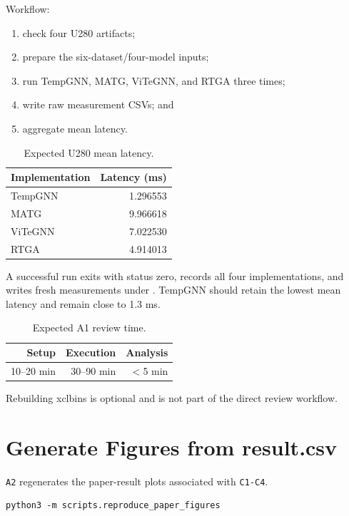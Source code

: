 \documentclass[conference]{IEEEtran}
\begin{document}
\noindent Workflow:
\begin{enumerate}
\item check four U280 artifacts;
\item prepare the six-dataset/four-model inputs;
\item run TempGNN, MATG, ViTeGNN, and RTGA three times;
\item write raw measurement CSVs; and
\item aggregate mean latency.
\end{enumerate}

\begin{table}[h]
\caption{Expected U280 mean latency.}
\centering
\begin{tabular}{lr}
\toprule
Implementation & Latency (ms) \\
\midrule
TempGNN & 1.296553 \\
MATG & 9.966618 \\
ViTeGNN & 7.022530 \\
RTGA & 4.914013 \\
\bottomrule
\end{tabular}
\end{table}

A successful run exits with status zero, records all four implementations, and
writes fresh measurements under
. TempGNN should retain the lowest
mean latency and remain close to 1.3 ms.

\begin{table}[h]
\caption{Expected A1 review time.}
\centering
\begin{tabular}{rrr}
\toprule
Setup & Execution & Analysis \\
\midrule
10--20 min & 30--90 min & $<$5 min \\
\bottomrule
\end{tabular}
\end{table}

Rebuilding xclbins is optional and is not part of the direct review workflow.

\section{Generate Figures from result.csv}

\texttt{A2} regenerates the paper-result plots associated with
\texttt{C1-C4}.

\begin{Verbatim}[fontsize=\small,breaklines=true,breakanywhere=true]
python3 -m scripts.reproduce_paper_figures
\end{Verbatim}
\end{document}
